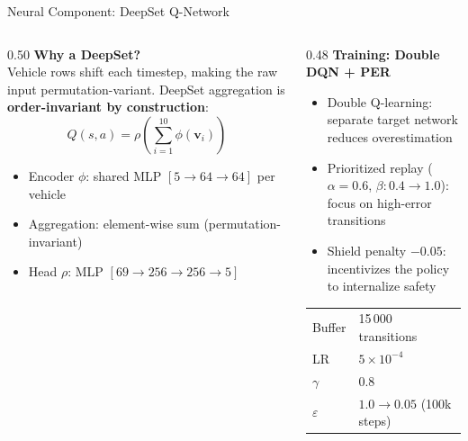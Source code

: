 \documentclass[aspectratio=169,10pt]{beamer}
\begin{document}
\begin{frame}{Neural Component: DeepSet Q-Network}
  \begin{columns}[T]
    \begin{column}{0.50\textwidth}
      \textbf{Why a DeepSet?}\\[4pt]
      Vehicle rows shift each timestep, making the raw input permutation-variant.
      DeepSet aggregation is \textbf{order-invariant by construction}:
      \[
        Q(s,a) = \rho\!\left(\textstyle\sum_{i=1}^{10} \phi(\mathbf{v}_i)\right)
      \]
      \begin{itemize}[<2->]\small
        \item Encoder \(\phi\): shared MLP \([5\!\to\!64\!\to\!64]\) per vehicle
        \item Aggregation: element-wise sum (permutation-invariant)
        \item Head \(\rho\): MLP \([69\!\to\!256\!\to\!256\!\to\!5]\)
      \end{itemize}
    \end{column}
    \begin{column}{0.48\textwidth}
      \pause
      \textbf{Training: Double DQN + PER}
      \begin{itemize}[<+->]\small
        \item Double Q-learning: separate target network reduces overestimation
        \item Prioritized replay (\(\alpha{=}0.6\), \(\beta{:}0.4{\to}1.0\)): focus on high-error transitions
        \item Shield penalty \(-0.05\): incentivizes the policy to internalize safety
      \end{itemize}

      \pause\vspace{6pt}
      {\footnotesize
        \begin{tabular}{@{}ll@{}}
          Buffer  & 15\,000 transitions \\
          LR      & \(5\times10^{-4}\) \\
          \(\gamma\)  & \(0.8\) \\
          \(\varepsilon\) & \(1.0 \to 0.05\) (100k steps) \\
      \end{tabular}}
    \end{column}
  \end{columns}
\end{frame}
\end{document}
